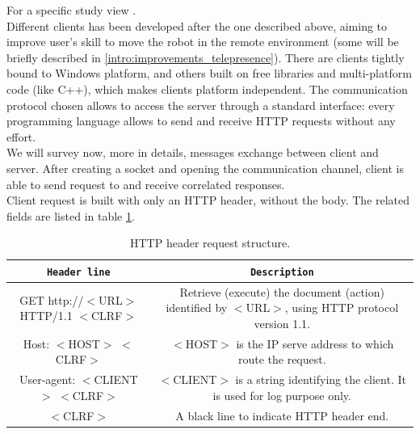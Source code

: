 For a specific study view \cite{morduc:neri}.
\\
Different clients has been developed after the one described above, aiming to
improve user's skill to move the robot in the remote environment
(some will be briefly described in \ref{intro:improvements_telepresence}). There are
clients tightly bound to Windows platform, and others
built on free libraries and multi-platform code (like C++), which makes clients
platform independent. The communication protocol chosen allows to
access the server through a standard interface: every programming language
allows to send and receive HTTP requests without any effort.
\\
We will survey now, more in details, messages exchange between client and server.
After creating a socket and opening the communication channel, client is able
to send request to \morduc{} and receive correlated responses.
\\
Client request is built with only an HTTP header, without the body. The related
fields are listed in table \ref{table:header_request}.

\begin{table}[h]
  \centering  
  \begin{tabular}{| c | c |}

    \hline
    \texttt{\bf Header line} &
    \texttt{\bf Description} \\ %

    \hline
    \parbox[t]{6.5cm}{\raggedright \small GET http://$<$URL$>$ HTTP/1.1 $<$CLRF$>$} &
    \parbox[t]{6cm}{\raggedright \small
      Retrieve (execute) the document (action) identified by $<$URL$>$,
      using HTTP protocol version 1.1.} \\  [1ex]

    \hline
    \parbox[t]{6.5cm}{\raggedright \small Host: $<$HOST$>$ $<$CLRF$>$} &
    \parbox[t]{6cm}{\raggedright \small
      $<$HOST$>$ is the IP serve address to which route the request.} \\ [1ex]
    
    \hline
    \parbox[t]{6.5cm}{\raggedright \small User-agent:  $<$CLIENT$>$ $<$CLRF$>$} &
    \parbox[t]{6cm}{\raggedright \small
      $<$CLIENT$>$ is a string identifying the client. It is used for log
      purpose only.} \\  [1ex]

    \hline
    \parbox[t]{6.5cm}{\raggedright \small $<$CLRF$>$} &
    \parbox[t]{6cm}{\raggedright \small
      A black line to indicate HTTP header end.} \\ [1ex]

    \hline

  \end{tabular}
  \caption{HTTP header request structure.}
  \label{table:header_request}
\end{table}

